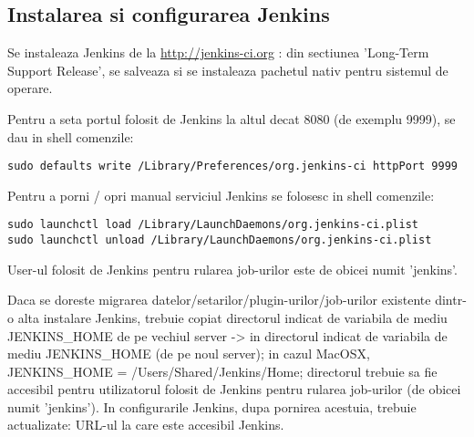 \subsection{Instalarea si configurarea Jenkins}


Se instaleaza Jenkins de la \url{http://jenkins-ci.org} : 
din sectiunea 'Long-Term Support Release', 
se salveaza si se instaleaza pachetul nativ pentru sistemul de operare.

Pentru a seta portul folosit de Jenkins la altul decat 8080 (de exemplu 9999), se dau in shell comenzile:
\begin{lstlisting}[breaklines=true]
sudo defaults write /Library/Preferences/org.jenkins-ci httpPort 9999
\end{lstlisting}

Pentru a porni / opri manual serviciul Jenkins se folosesc in shell comenzile: 
\begin{lstlisting}[breaklines=true]
sudo launchctl load /Library/LaunchDaemons/org.jenkins-ci.plist
sudo launchctl unload /Library/LaunchDaemons/org.jenkins-ci.plist
\end{lstlisting}

User-ul folosit de Jenkins pentru rularea job-urilor este de obicei numit 'jenkins'.

Daca se doreste migrarea datelor/setarilor/plugin-urilor/job-urilor existente dintr-o alta instalare Jenkins, trebuie copiat directorul indicat de variabila de mediu JENKINS\_HOME de pe vechiul server -> in directorul indicat de variabila de mediu JENKINS\_HOME (de pe noul server); in cazul MacOSX, JENKINS\_HOME = /Users/Shared/Jenkins/Home; directorul trebuie sa fie accesibil pentru utilizatorul folosit de Jenkins pentru rularea job-urilor (de obicei numit 'jenkins'). In configurarile Jenkins, dupa pornirea acestuia,  trebuie actualizate: URL-ul la care este accesibil Jenkins.

